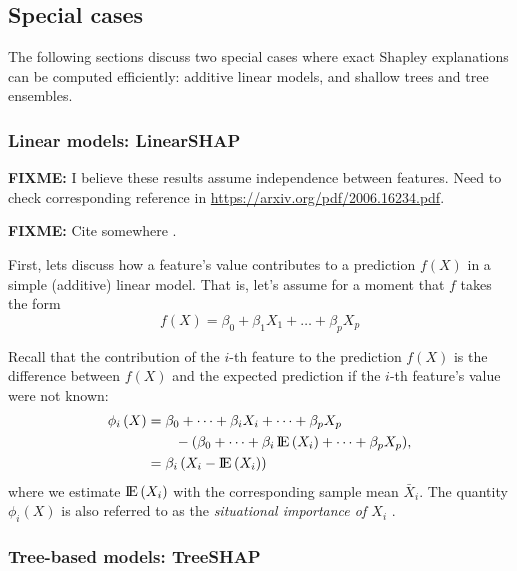 \hypertarget{special-cases}{%
\subsection{Special cases}\label{special-cases}}

The following sections discuss two special cases where exact Shapley
explanations can be computed efficiently: additive linear models, and
shallow trees and tree ensembles.

\hypertarget{linear-models-linearshap}{%
\subsubsection{Linear models:
LinearSHAP}\label{linear-models-linearshap}}

\textbf{FIXME:} I believe these results assume independence between
features. Need to check corresponding reference in
\url{https://arxiv.org/pdf/2006.16234.pdf}.

\textbf{FIXME:} Cite somewhere \cite{strumbelj-2014-explaining}.

First, lets discuss how a feature's value contributes to a prediction
\(f\left(X\right)\) in a simple (additive) linear model. That is, let's
assume for a moment that \(f\) takes the form \begin{equation}
\nonumber
  f\left(X\right) = \beta_0 + \beta_1 X_1 + \dots + \beta_p X_p
\end{equation}

Recall that the contribution of the \(i\)-th feature to the prediction
\(f\left(X\right)\) is the difference between \(f\left(X\right)\) and
the expected prediction if the \(i\)-th feature's value were not known:
\begin{equation}
\nonumber
\begin{split}
  \phi_i\left(X\right) &= \beta_0 + \dots + \beta_i X_i + \dots + \beta_p X_p \\ &\quad\quad - \left(\beta_0 + \dots + \beta_i \E\left(X_i\right) + \dots + \beta_p X_p\right) \\
  &= \beta_i \left(X_i - \E\left(X_i\right)\right)
\end{split},
\end{equation} where we estimate \(\E\left(X_i\right)\) with the
corresponding sample mean \(\bar{X}_i\). The quantity
\(\phi_i\left(X\right)\) is also referred to as the
\emph{situational importance of $X_i$} \citep{achen-1982-interpreting}.

\hypertarget{tree-based-models-treeshap}{%
\subsubsection{Tree-based models:
TreeSHAP}\label{tree-based-models-treeshap}}

